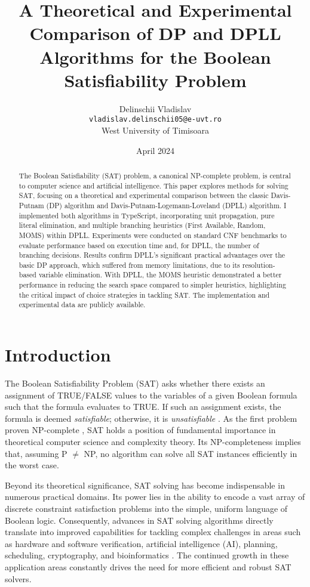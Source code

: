 \documentclass[12pt, a4paper]{article}
\title{A Theoretical and Experimental Comparison of DP and DPLL Algorithms for the Boolean Satisfiability Problem}
\author{Delinschii Vladislav\\ \texttt{vladislav.delinschii05@e-uvt.ro} \\ West University of Timisoara}
\date{April 2024}
\begin{document}
\maketitle

\begin{abstract}
The Boolean Satisfiability (SAT) problem, a canonical NP-complete problem, is central to computer science and artificial intelligence. This paper explores methods for solving SAT, focusing on a theoretical and experimental comparison between the classic Davis-Putnam (DP) algorithm and Davis-Putnam-Logemann-Loveland (DPLL) algorithm. I implemented both algorithms in TypeScript, incorporating unit propagation, pure literal elimination, and multiple branching heuristics (First Available, Random, MOMS) within DPLL. Experiments were conducted on standard CNF benchmarks to evaluate performance based on execution time and, for DPLL, the number of branching decisions. Results confirm DPLL's significant practical advantages over the basic DP approach, which suffered from memory limitations, due to its resolution-based variable elimination. With DPLL, the MOMS heuristic demonstrated a better performance in reducing the search space compared to simpler heuristics, highlighting the critical impact of choice strategies in tackling SAT. The implementation and experimental data are publicly available.
\end{abstract}

\section{Introduction}
\label{sec:introduction} 
The Boolean Satisfiability Problem (SAT) asks whether there exists an assignment of TRUE/FALSE values to the variables of a given Boolean formula such that the formula evaluates to TRUE. If such an assignment exists, the formula is deemed \emph{satisfiable}; otherwise, it is \emph{unsatisfiable} \cite{Autoblocks}. As the first problem proven NP-complete \cite{Cook1971}, SAT holds a position of fundamental importance in theoretical computer science and complexity theory. Its NP-completeness implies that, assuming P $\neq$ NP, no algorithm can solve all SAT instances efficiently in the worst case.

Beyond its theoretical significance, SAT solving has become indispensable in numerous practical domains. Its power lies in the ability to encode a vast array of discrete constraint satisfaction problems into the simple, uniform language of Boolean logic. Consequently, advances in SAT solving algorithms directly translate into improved capabilities for tackling complex challenges in areas such as hardware and software verification, artificial intelligence (AI), planning, scheduling, cryptography, and bioinformatics \cite{Autoblocks}. The continued growth in these application areas constantly drives the need for more efficient and robust SAT solvers.
\end{document}
